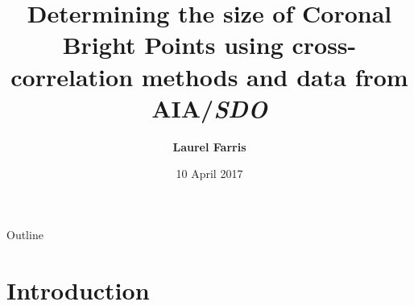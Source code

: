 \documentclass[9pt,table]{beamer}
\title{\textbf{Determining the size of Coronal Bright Points using cross-correlation
    methods and data from AIA/\textit{SDO}}}
\author{\textbf{Laurel Farris}}
\date{10 April 2017}
\begin{document}



\begin{frame}
    \titlepage{}
\end{frame}

\begin{frame}{Outline}
    \tableofcontents
\end{frame}

\section{Introduction}
\end{document}
